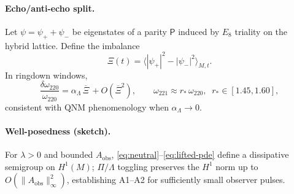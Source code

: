 \paragraph{Echo/anti-echo split.}
Let $\psi=\psi_+ + \psi_-$ be eigenstates of a parity $\mathsf{P}$ induced by $E_8$ triality on the hybrid lattice. Define the imbalance
\[
\Xi(t)=\big\langle |\psi_+|^2 - |\psi_-|^2 \big\rangle_{M,t}.
\]
In ringdown windows,
\begin{equation}
\frac{\delta\omega_{220}}{\omega_{220}}=\alpha_\Lambda \,\overline{\Xi}\,+O(\overline{\Xi}^{2}),\qquad
\omega_{221}\approx r_*\,\omega_{220},\;\; r_*\in[1.45,1.60],
\label{eq:dispersion}
\end{equation}
consistent with QNM phenomenology when $\alpha_\Lambda\!\to\!0$.

\paragraph{Well-posedness (sketch).}
For $\lambda>0$ and bounded $A_{\mathrm{obs}}$, \eqref{eq:neutral}–\eqref{eq:lifted-pde} define a dissipative semigroup on $H^1(M)$; $\Pi/\Lambda$ toggling preserves the $H^1$ norm up to $O(\|A_{\mathrm{obs}}\|_\infty^2)$, establishing A1–A2 for sufficiently small observer pulses.
